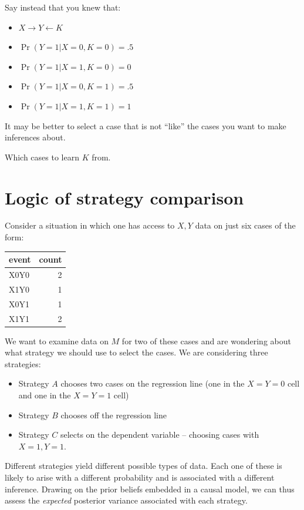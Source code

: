 \documentclass[
  12pt,
]{book}
\providecommand{\tightlist}{%
  \setlength{\itemsep}{0pt}\setlength{\parskip}{0pt}}
\begin{document}
Say instead that you knew that:

\begin{itemize}
\tightlist
\item
  \(X \rightarrow Y \leftarrow K\)
\item
  \(\Pr(Y=1|X=0, K = 0) = .5\)
\item
  \(\Pr(Y=1|X=1, K = 0) = 0\)
\item
  \(\Pr(Y=1|X=0, K = 1) = .5\)
\item
  \(\Pr(Y=1|X=1, K = 1) = 1\)
\end{itemize}

It may be better to select a case that is not ``like'' the cases you want to make inferences about.

Which cases to learn \(K\) from.

\hypertarget{logic-of-strategy-comparison}{%
\section{Logic of strategy comparison}\label{logic-of-strategy-comparison}}

Consider a situation in which one has access to \(X,Y\) data on just six cases of the form:

\begin{tabular}{l|r}
\hline
event & count\\
\hline
X0Y0 & 2\\
\hline
X1Y0 & 1\\
\hline
X0Y1 & 1\\
\hline
X1Y1 & 2\\
\hline
\end{tabular}

We want to examine data on \(M\) for two of these cases and are wondering about what strategy we should use to select the cases. We are considering three strategies:

\begin{itemize}
\tightlist
\item
  Strategy \(A\) chooses two cases on the regression line (one in the \(X=Y=0\) cell and one in the \(X=Y=1\) cell)
\item
  Strategy \(B\) chooses off the regression line
\item
  Strategy \(C\) selects on the dependent variable -- choosing cases with \(X=1, Y = 1\).
\end{itemize}

Different strategies yield different possible types of data. Each one of these is likely to arise with a different probability and is associated with a different inference. Drawing on the prior beliefs embedded in a causal model, we can thus assess the \emph{expected} posterior variance associated with each strategy.
\end{document}
